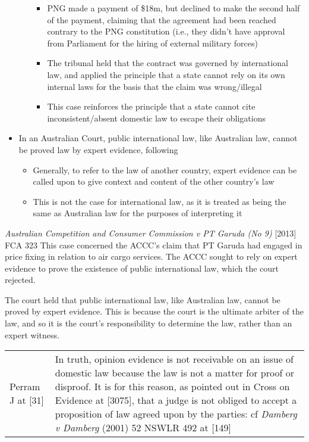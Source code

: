 \begin{itemize}
\begin{itemize}
\begin{itemize}
            \item PNG made a payment of \$18m, but declined to make the second half of the payment, claiming that the agreement had been reached contrary to the PNG constitution (i.e., they didn't have approval from Parliament for the hiring of external military forces)
            \item The tribunal held that the contract was governed by international law, and applied the principle that a state cannot rely on its own internal laws for the basis that the claim was wrong/illegal
            \item This case reinforces the principle that a state cannot cite inconsistent/absent domestic law to escape their obligations
        \end{itemize}
    \end{itemize}
    \item In an Australian Court, public international law, like Australian law, cannot be proved law by expert evidence, following 
    \begin{itemize}
        \item Generally, to refer to the law of another country, expert evidence can be called upon to give context and content of the other country's law
        \item This is not the case for international law, as it is treated as being the same as Australian law for the purposes of interpreting it
    \end{itemize}
\end{itemize}

\begin{casedetails}{\textit{Australian Competition and Consumer Commission v PT Garuda (No 9)} [2013] FCA 323}
    \flushleft
    This case concerned the ACCC's claim that PT Garuda had engaged in price fixing in relation to air cargo services. The ACCC sought to rely on expert evidence to prove the existence of public international law, which the court rejected.

    \vspace{\baselineskip}

    The court held that public international law, like Australian law, cannot be proved by expert evidence. This is because the court is the ultimate arbiter of the law, and so it is the court's responsibility to determine the law, rather than an expert witness.

    \begin{longtable}{p{}|>{\raggedright\arraybackslash}p{}}
        Perram J at [31] & In truth, opinion evidence is not receivable on an issue of domestic law because the law is not a matter for proof or disproof. It is for this reason, as pointed out in Cross on Evidence at [3075], that a judge is not obliged to accept a proposition of law agreed upon by the parties: cf \textit{Damberg v Damberg} (2001) 52 NSWLR 492 at [149]
    \end{longtable}  
\end{casedetails}

